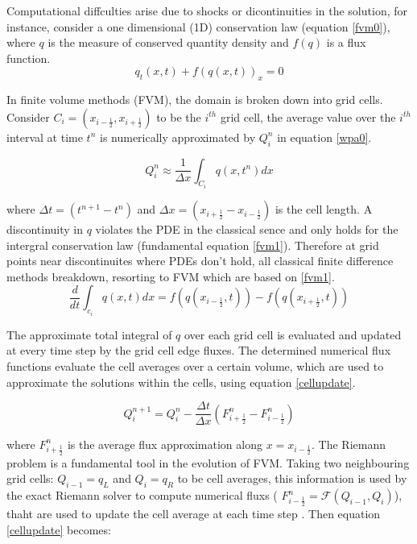 \documentclass[12pt,a4paper]{article}
\begin{document}
		\noindent Computational diffculties arise  due to shocks or dicontinuities in the solution, for instance, consider a one dimensional (1D) conservation law  (equation \eqref{fvm0}),  where $q$ is the measure of conserved quantity density and $f(q)$ is a flux function.
	\begin{equation}
		q_{t}(x,t) + f(q(x,t))_{x} = 0
		\label{fvm0}
	\end{equation}

	\noindent In finite volume methods (FVM), the domain is broken down into grid cells. Consider $C_{i} = (x_{i-\frac{1}{2}},x_{i+\frac{1}{2}})$ to be the $i^{th}$ grid cell, the average value over the $i^{th}$ interval at time $t^{n}$ is numerically approximated by $Q_{i}^{n}$ in equation \eqref{wpa0}.
	
	\begin{equation}
		Q_{i}^{n} \approx \dfrac{1}{\Delta x} \int_{C_{i}}q(x,t^{n})dx
		\label{wpa0}
	\end{equation}
	
	\noindent  where $\Delta t = (t^{n+1} - t^{n})$ and  $\Delta x = (x_{i+\frac{1}{2}} - x_{i-\frac{1}{2}})$ is the cell length. A discontinuity in $q$ violates the PDE in the classical sence and only holds for the intergral conservation law (fundamental equation \eqref{fvm1}). Therefore at grid points near discontinuites where PDEs don't hold, all classical finite difference methods breakdown, resorting to FVM which are based on \eqref{fvm1}. 	
	\begin{equation}
		\frac{d}{dt} \int_{c_{i}} q(x,t)dx = f(q(x_{i-\frac{1}{2}},t)) -  f(q(x_{i+\frac{1}{2}},t))
		\label{fvm1}
	\end{equation}
	  
	  
	  \noindent The approximate  total integral of $q$ over each grid cell is evaluated and updated at every time step by the grid cell edge fluxes. The determined numerical flux functions evaluate the  cell averages over a certain volume, which are used to approximate the solutions within the cells, using equation \eqref{cellupdate}.
	  
	  \begin{equation}
	  	Q_{i}^{n+1} = Q_{i}^{n} - \frac{\Delta t}{\Delta x} (F_{i+\frac{1}{2}}^{n} - F_{i-\frac{1}{2}}^{n})
	  	\label{cellupdate}
	  \end{equation}
  
	  \noindent where $F_{i+\frac{1}{2}}^{n} $ is the average flux approximation along $x=x_{i-\frac{1}{2}}$.
      The Riemann problem is a fundamental tool in the evolution of FVM. Taking two neighbouring grid cells: $Q_{i-1} = q_{L}$ and $Q_{i} = q_{R}$ to be cell averages, this information is used by the exact Riemann solver to compute numerical fluxs ( $F_{i-\frac{1}{2}}^{n} = \mathcal{F}(Q_{i-1} , Q_{i} )$), thaht are used to update the cell average at each time step \cite{ba-le-mi-ro:2003}. Then equation \eqref{cellupdate} becomes:
      
\end{document}
